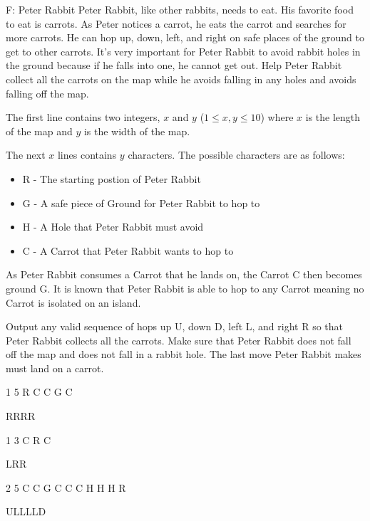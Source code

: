 \begin{problem}{F: Peter Rabbit}
Peter Rabbit, like other rabbits, needs to eat. His favorite food to eat is carrots.
As Peter notices a carrot, he eats the carrot and searches for more carrots.
He can hop up, down, left, and right on safe places of the ground to get to other carrots.
It's very important for Peter Rabbit to avoid rabbit holes in the ground because if he falls into one, he cannot get out.
Help Peter Rabbit collect all the carrots on the map while he avoids falling in any holes and avoids falling off the map.
\end{problem}

\begin{formalin}
The first line contains two integers, $x$ and $y$ ($1 \leq x, y \leq 10$) where $x$ is the length of the map and $y$ is the width of the map.

The next $x$ lines contains $y$ characters. The possible characters are as follows:
\begin{itemize}
\item R - The starting postion of Peter Rabbit
\item G - A safe piece of Ground for Peter Rabbit to hop to
\item H - A Hole that Peter Rabbit must avoid
\item C - A Carrot that Peter Rabbit wants to hop to
\end{itemize}

As Peter Rabbit consumes a Carrot that he lands on, the Carrot C then becomes ground G.
It is known that Peter Rabbit is able to hop to any Carrot meaning no Carrot is isolated on an island.
\end{formalin}

\begin{formalout}
Output any valid sequence of hops up U, down D, left L, and right R so that Peter Rabbit collects all the carrots.
Make sure that Peter Rabbit does not fall off the map and does not fall in a rabbit hole.
The last move Peter Rabbit makes must land on a carrot.
\end{formalout}

\begin{datain}
1 5
R C C G C
\end{datain}
\begin{dataout}
RRRR
\end{dataout}

\begin{datain}
1 3
C R C
\end{datain}
\begin{dataout}
LRR
\end{dataout}

\begin{datain}
2 5
C C G C C
C H H H R
\end{datain}
\begin{dataout}
ULLLLD
\end{dataout}
